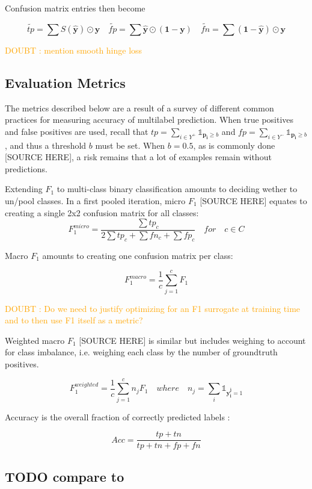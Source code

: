 \documentclass[sigconf,natbib,screen=true,review=true,anonymous]{acmart}
\newcommand\doubt[1]{\textcolor{orange}{DOUBT : #1}}
\begin{document}
Confusion matrix entries then become

$$
\tilde{tp}=\sum S(\hat{\mathbf{y}}) \odot \mathbf{y} \quad \tilde{fp} = \sum \hat{\mathbf{y}} \odot (\mathbf{1} - \mathbf{y}) \quad \tilde{fn} = \sum (\mathbf{1} - \hat{\mathbf{y}}) \odot \mathbf{y}
$$


\doubt{mention smooth hinge loss} \cite{smoothHinge}

\subsection{Evaluation Metrics}
\label{sec:orgf52b7d6}

The metrics described below are a result of a survey of different common practices for measuring accuracy of multilabel prediction. When true positives and false positives are used, recall that \(t p=\sum_{i \in Y^{+}} \mathds{1}_{\mathbf{p_i} \geq b}\) and \(f p=\sum_{i \in Y^{-}} \mathds{1}_{\mathbf{p_i} \geq b}\), and thus a threshold \(b\) must be set. When \(b = 0.5\), as is commonly done [SOURCE HERE], a risk remains that a lot of examples remain without predictions.

Extending \(F_1\) to multi-class binary classification amounts to deciding wether to un/pool classes.
In a first pooled iteration, micro \(F_1\) [SOURCE HERE] equates to creating a single 2x2 confusion matrix for all classes:
$$F_1^{micro} = \frac{\sum tp_c}{2 \sum tp_c + \sum fn_c + \sum fp_c} \quad for \quad c \in C$$

Macro \(F_1\) \cite{threshForF1} amounts to creating one confusion matrix per class:

$$F_1^{macro} = \frac{1}{c} \sum_{j=1}^c F_1$$

\doubt{Do we need to justify optimizing for an F1 surrogate at training time and to then use F1 itself as a metric?}

Weighted macro \(F_1\) [SOURCE HERE] is similar but includes weighing to account for class imbalance, i.e. weighing each class by the number of groundtruth positives.

$$F_1^{weighted} = \frac{1}{c} \sum_{j=1}^c n_j F_1 \quad where \quad n_j = \sum_i \mathds{1}_{\mathbf{y_i^j} = 1}$$

Accuracy is the overall fraction of correctly predicted labels \cite{threshForF1}:

$$
A c c=\frac{t p+t n}{t p+t n+f p+f n}
$$


\subsection*{{\color{red}\bfseries\sffamily TODO} compare to  \cite{lossComp}}
\label{sec:org558565e}
\end{document}

